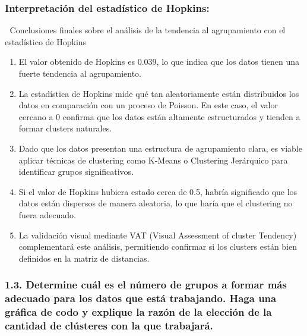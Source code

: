 \documentclass[
]{article}
\begin{document}
\subsubsection{Interpretación del estadístico de
Hopkins:}\label{interpretaciuxf3n-del-estaduxedstico-de-hopkins}

📌 Conclusiones finales sobre el análisis de la tendencia al
agrupamiento con el estadístico de Hopkins

\begin{enumerate}
\def\labelenumi{\arabic{enumi}.}
\item
  El valor obtenido de Hopkins es 0.039, lo que indica que los datos
  tienen una fuerte tendencia al agrupamiento.
\item
  La estadística de Hopkins mide qué tan aleatoriamente están
  distribuidos los datos en comparación con un proceso de Poisson. En
  este caso, el valor cercano a 0 confirma que los datos están altamente
  estructurados y tienden a formar clusters naturales.
\item
  Dado que los datos presentan una estructura de agrupamiento clara, es
  viable aplicar técnicas de clustering como K-Means o Clustering
  Jerárquico para identificar grupos significativos.
\item
  Si el valor de Hopkins hubiera estado cerca de 0.5, habría significado
  que los datos están dispersos de manera aleatoria, lo que haría que el
  clustering no fuera adecuado.
\item
  La validación visual mediante VAT (Visual Assessment of cluster
  Tendency) complementará este análisis, permitiendo confirmar si los
  clusters están bien definidos en la matriz de distancias.
\end{enumerate}

\subsubsection{1.3. Determine cuál es el número de grupos a formar más
adecuado para los datos que está trabajando. Haga una gráfica de codo y
explique la razón de la elección de la cantidad de clústeres con la que
trabajará.}\label{determine-cuuxe1l-es-el-nuxfamero-de-grupos-a-formar-muxe1s-adecuado-para-los-datos-que-estuxe1-trabajando.-haga-una-gruxe1fica-de-codo-y-explique-la-razuxf3n-de-la-elecciuxf3n-de-la-cantidad-de-cluxfasteres-con-la-que-trabajaruxe1.}
\end{document}
